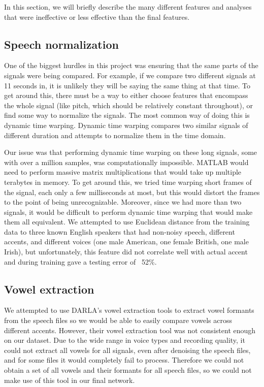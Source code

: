 \documentclass{article}
\begin{document}
In this section, we will briefly describe the many different features and analyses that were ineffective or less effective than the final features.

\subsection{Speech normalization}
\label{subsec:normalization}

One of the biggest hurdles in this project was ensuring that the same parts of the signals were being compared.
For example, if we compare two different signals at 11 seconds in, it is unlikely they will be saying the same thing at that time.
To get around this, there must be a way to  either choose features that encompass the whole signal (like pitch, which should be relatively constant throughout), or find some way to normalize the signals.
The most common way of doing this is dynamic time warping.
Dynamic time warping compares two similar signals of different duration and attempts to normalize them in the time domain.

Our issue was that performing dynamic time warping on these long signals, some with over a million samples, was computationally impossible.
MATLAB would need to perform massive matrix multiplications that would take up multiple terabytes in memory.
To get around this, we tried time warping short frames of the signal, each only a few milliseconds at most, but this would distort the frames to the point of being unrecognizable.
Moreover, since we had more than two signals, it would be difficult to perform dynamic time warping that would make them all equivalent.
We attempted to use Euclidean distance from the training data to three known English speakers that had non-noisy speech, different accents, and different voices (one male American, one female British, one male Irish), but unfortunately, this feature did not correlate well with actual accent and during training gave a testing error of ~52\%.

\subsection{Vowel extraction}
\label{subsec:vowel}

We attempted to use DARLA’s vowel extraction tools \cite{DARLA} to extract vowel formants from the speech files so we would be able to easily compare vowels across different accents.
However, their vowel extraction tool was not consistent enough on our dataset.
Due to the wide range in voice types and recording quality, it could not extract all vowels for all signals, even after denoising the speech files, and for some files it would completely fail to process.
Therefore we could not obtain a set of all vowels and their formants for all speech files, so we could not make use of this tool in our final network.
\end{document}
